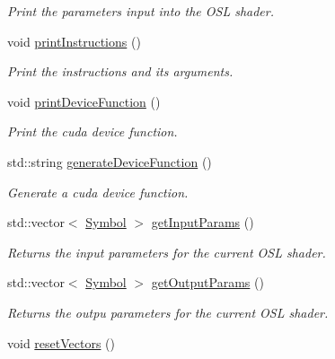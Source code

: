\begin{DoxyCompactItemize}
\begin{DoxyCompactList}\small\item\em Print the parameters input into the O\-S\-L shader. \end{DoxyCompactList}\item 
\hypertarget{class_oso_reader_aea174af45dda3f23270c73cd5e67f204}{void \hyperlink{class_oso_reader_aea174af45dda3f23270c73cd5e67f204}{print\-Instructions} ()}\label{class_oso_reader_aea174af45dda3f23270c73cd5e67f204}

\begin{DoxyCompactList}\small\item\em Print the instructions and its arguments. \end{DoxyCompactList}\item 
\hypertarget{class_oso_reader_a0a244e8ed195f3752af6738e0de045b4}{void \hyperlink{class_oso_reader_a0a244e8ed195f3752af6738e0de045b4}{print\-Device\-Function} ()}\label{class_oso_reader_a0a244e8ed195f3752af6738e0de045b4}

\begin{DoxyCompactList}\small\item\em Print the cuda device function. \end{DoxyCompactList}\item 
std\-::string \hyperlink{class_oso_reader_a73b356139df5730e756f2366ec1e1924}{generate\-Device\-Function} ()
\begin{DoxyCompactList}\small\item\em Generate a cuda device function. \end{DoxyCompactList}\item 
\hypertarget{class_oso_reader_a7929682e9581cd8fa5c9c80fbb27e12a}{std\-::vector$<$ \hyperlink{struct_symbol}{Symbol} $>$ \hyperlink{class_oso_reader_a7929682e9581cd8fa5c9c80fbb27e12a}{get\-Input\-Params} ()}\label{class_oso_reader_a7929682e9581cd8fa5c9c80fbb27e12a}

\begin{DoxyCompactList}\small\item\em Returns the input parameters for the current O\-S\-L shader. \end{DoxyCompactList}\item 
\hypertarget{class_oso_reader_af7c60fc9a4d066d9e6689ef0f54e2baa}{std\-::vector$<$ \hyperlink{struct_symbol}{Symbol} $>$ \hyperlink{class_oso_reader_af7c60fc9a4d066d9e6689ef0f54e2baa}{get\-Output\-Params} ()}\label{class_oso_reader_af7c60fc9a4d066d9e6689ef0f54e2baa}

\begin{DoxyCompactList}\small\item\em Returns the outpu parameters for the current O\-S\-L shader. \end{DoxyCompactList}\item 
\hypertarget{class_oso_reader_a90d5c3b4f09cceeffff0d5ff1d3dde41}{void \hyperlink{class_oso_reader_a90d5c3b4f09cceeffff0d5ff1d3dde41}{reset\-Vectors} ()}\label{class_oso_reader_a90d5c3b4f09cceeffff0d5ff1d3dde41}


\end{DoxyCompactItemize}
